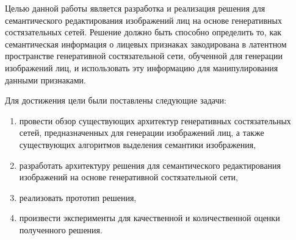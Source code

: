 Целью данной работы является разработка и реализация решения для семантического редактирования изображений лиц на основе генеративных состязательных сетей. 
Решение должно быть способно определить то, как семантическая информация о лицевых признаках закодирована в латентном пространстве генеративной состязательной сети, обученной для генерации изображений лиц, и использовать эту информацию для манипулирования данными признаками.

Для достижения цели были поставлены следующие задачи:

\begin{enumerate}
\item провести обзор существующих архитектур генеративных состязательных сетей, предназначенных для генерации изображений лиц, а также существующих алгоритмов выделения семантики изображения,
\item разработать архитектуру решения для семантического редактирования изображений на основе генеративной состязательной сети,
\item реализовать прототип решения,
\item произвести эксперименты для качественной и количественной оценки полученного решения.
\end{enumerate}
